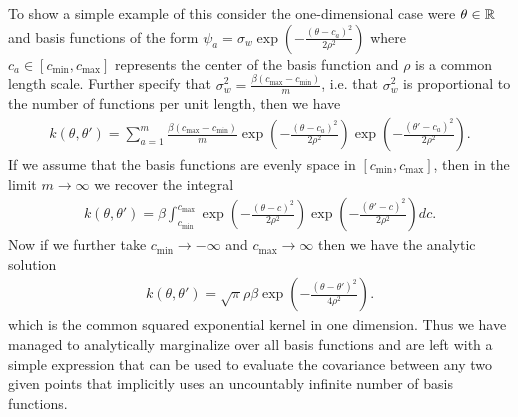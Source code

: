 To show a simple example of this consider the one-dimensional case were $\theta \in \mathbb{R}$ and basis functions of the form  $\psi_a = \sigma_w\exp \left(-\frac{\left( \theta-c_a\right)^2}{2 \rho^2}\right)$ where $c_a \in \left[c_{\min},c_{\max}\right]$ represents the center of the basis function and $\rho$ is a common length scale.  Further specify that $\sigma_w^2 = \frac{\beta \left(c_{\max}-c_{\min}\right)}{m}$, i.e. that $\sigma_w^2$ is proportional to the number of functions per unit length, then we have
\begin{align}
\label{eq:opt:kSeqExpFinite}
k\left(\theta,\theta'\right) = \sum_{a=1}^{m} \frac{\beta \left(c_{\max}-c_{\min}\right)}{m} \exp \left(-\frac{\left( \theta-c_a\right)^2}{2 \rho^2}\right) \exp \left(-\frac{\left(\theta'-c_a\right)^2}{2 \rho^2}\right).
\end{align}
If we assume that the basis functions are evenly space in $\left[c_{\min},c_{\max}\right]$, then in the limit $m \rightarrow \infty$
we recover the integral
\begin{align}
\label{eq:opt:kSeqExpIntegral}
k\left(\theta,\theta'\right) = \beta \int_{c_{\min}}^{c_{\max}}  \exp \left(-\frac{\left( \theta-c\right)^2}{2 \rho^2}\right) \exp \left(-\frac{\left(\theta'-c\right)^2}{2 \rho^2}\right) dc.
\end{align}
Now if we further take $c_{\min} \rightarrow -\infty$ and $c_{\max} \rightarrow \infty$ then we have the analytic solution
\begin{align}
\label{eq:opt:seqExpProof}
k\left(\theta,\theta'\right) = \sqrt{\pi} \rho \beta \exp \left(-\frac{\left(\theta-\theta'\right)^2}{4 \rho^2}\right).
\end{align}
which is the common squared exponential kernel in one dimension.  Thus we have managed to analytically marginalize over all basis functions and are left with a simple expression that can be used to evaluate the covariance between any two given points that implicitly uses an uncountably infinite number of basis functions.

